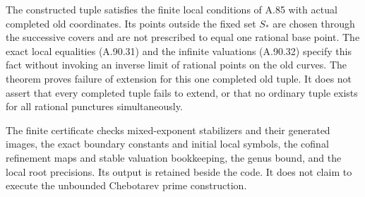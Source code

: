 The constructed tuple satisfies the finite local
conditions of A.85 with actual completed old
coordinates.
Its points outside the fixed set $S_*$ are chosen
through the successive covers and are not prescribed
to equal one rational base point.
The exact local equalities (A.90.31) and the
infinite valuations (A.90.32) specify this fact
without invoking an inverse limit of rational
points on the old curves.
The theorem proves failure of extension for this
one completed old tuple.
It does not assert that every completed tuple
fails to extend, or that no ordinary tuple exists
for all rational punctures simultaneously.

The finite certificate
checks mixed-exponent stabilizers and their
generated images, the exact boundary constants
and initial local symbols, the cofinal refinement
maps and stable valuation bookkeeping, the
genus bound, and the local root precisions.
Its output is retained beside the code.
It does not claim to execute the unbounded
Chebotarev prime construction.
